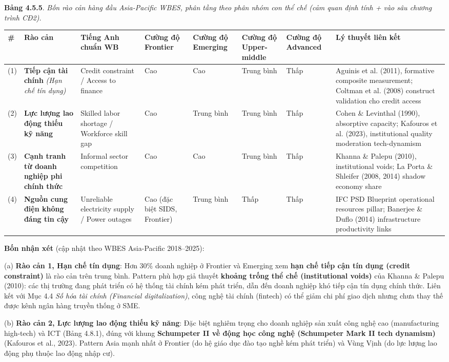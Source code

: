 \documentclass[12pt,a4paper]{article}
\begin{document}
\textbf{Bảng 4.5.5}. \emph{Bốn rào cản hàng đầu Asia-Pacific WBES, phân
tầng theo phân nhóm con thể chế (cảm quan định tính + vào sâu chương
trình CĐ2).}

\begin{longtable}[]{@{}llllllll@{}}
\toprule\noalign{}
\# & Rào cản & Tiếng Anh chuẩn WB & Cường độ Frontier & Cường độ
Emerging & Cường độ Upper-middle & Cường độ Advanced & Lý thuyết liên
kết \\
\midrule\noalign{}
\endhead
\bottomrule\noalign{}
\endlastfoot
(1) & \textbf{Tiếp cận tài chính} \emph{(Hạn chế tín dụng)} & Credit
constraint / Access to finance & Cao & Cao & Trung bình & Thấp & Aguinis
et al. (2011), formative composite measurement; Coltman et al. (2008)
construct validation cho credit access \\
(2) & \textbf{Lực lượng lao động thiếu kỹ năng} & Skilled labor shortage
/ Workforce skill gap & Cao & Trung bình & Trung bình & Thấp & Cohen \&
Levinthal (1990), absorptive capacity; Kafouros et al. (2023),
institutional quality moderation tech-dynamism \\
(3) & \textbf{Cạnh tranh từ doanh nghiệp phi chính thức} & Informal
sector competition & Cao & Cao & Trung bình & Thấp & Khanna \& Palepu
(2010), institutional voids; La Porta \& Shleifer (2008, 2014) shadow
economy share \\
(4) & \textbf{Nguồn cung điện không đáng tin cậy} & Unreliable
electricity supply / Power outages & Cao (đặc biệt SIDS, Frontier) &
Trung bình & Thấp & Thấp & IFC PSD Blueprint operational resources
pillar; Banerjee \& Duflo (2014) infrastructure productivity links \\
\end{longtable}

\textbf{Bốn nhận xét} (cập nhật theo WBES Asia-Pacific 2018--2025):

(a) \textbf{Rào cản 1, Hạn chế tín dụng}: Hơn 30\% doanh nghiệp ở
Frontier và Emerging xem \textbf{hạn chế tiếp cận tín dụng (credit
constraint)} là rào cản trên trung bình. Pattern phù hợp giả thuyết
\textbf{khoảng trống thể chế (institutional voids)} của Khanna \& Palepu
(2010): các thị trường đang phát triển có hệ thống tài chính kém phát
triển, dẫn đến doanh nghiệp khó tiếp cận tín dụng chính thức. Liên kết
với Mục 4.4 \emph{Số hóa tài chính (Financial digitalization)}, công
nghệ tài chính (fintech) có thể giảm chi phí giao dịch nhưng chưa thay
thế được kênh ngân hàng truyền thống ở SME.

(b) \textbf{Rào cản 2, Lực lượng lao động thiếu kỹ năng}: Đặc biệt
nghiêm trọng cho doanh nghiệp sản xuất công nghệ cao (manufacturing
high-tech) và ICT (Bảng 4.8.1), đúng với khung \textbf{Schumpeter II về
động học công nghệ (Schumpeter Mark II tech dynamism)} (Kafouros et al.,
2023). Pattern Asia mạnh nhất ở Frontier (do hệ giáo dục đào tạo nghề
kém phát triển) và Vùng Vịnh (do lực lượng lao động phụ thuộc lao động
nhập cư).
\end{document}
